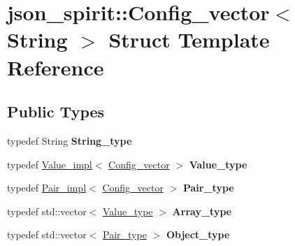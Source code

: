 \hypertarget{structjson__spirit_1_1_config__vector}{}\section{json\+\_\+spirit\+::Config\+\_\+vector$<$ String $>$ Struct Template Reference}
\label{structjson__spirit_1_1_config__vector}
\subsection*{Public Types}
\begin{DoxyCompactItemize}
\item 
\mbox{\label{structjson__spirit_1_1_config__vector_a9f0a96da6042290c5bc25c1b3269e747}} 
typedef String {\bfseries String\+\_\+type}
\item 
\mbox{\label{structjson__spirit_1_1_config__vector_aa06382368ae0d04aa77534d6f73592c8}} 
typedef \mbox{\hyperlink{classjson__spirit_1_1_value__impl}{Value\+\_\+impl}}$<$ \mbox{\hyperlink{structjson__spirit_1_1_config__vector}{Config\+\_\+vector}} $>$ {\bfseries Value\+\_\+type}
\item 
\mbox{\label{structjson__spirit_1_1_config__vector_ae65b82636d991e02baba4eb5ddfbd0d1}} 
typedef \mbox{\hyperlink{structjson__spirit_1_1_pair__impl}{Pair\+\_\+impl}}$<$ \mbox{\hyperlink{structjson__spirit_1_1_config__vector}{Config\+\_\+vector}} $>$ {\bfseries Pair\+\_\+type}
\item 
\mbox{\label{structjson__spirit_1_1_config__vector_af33059c26ec27a5153b53dd4bd312815}} 
typedef std\+::vector$<$ \mbox{\hyperlink{classjson__spirit_1_1_value__impl}{Value\+\_\+type}} $>$ {\bfseries Array\+\_\+type}
\item 
\mbox{\label{structjson__spirit_1_1_config__vector_a070c3d1a0aea6da7c24a60400d52f15d}} 
typedef std\+::vector$<$ \mbox{\hyperlink{structjson__spirit_1_1_pair__impl}{Pair\+\_\+type}} $>$ {\bfseries Object\+\_\+type}
\end{DoxyCompactItemize}
